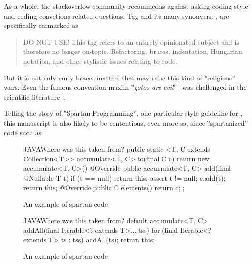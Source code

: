 As a whole, the stackoverlow community
recommedns against asking coding style and coding convetions related questions.
Tag  and its many synonyms: ,
 are specifically
earmarked as
\begin{quote}
DO NOT USE! This tag refers to an entirely opinionated subject and is therefore
no longer on-topic. Refactoring, braces, indentation, Hungarian notation, and
other stylistic issues relating to code.
\end{quote}
But it is not only curly braces matters that may raise
this kind of ‟religious” wars. Even the famous convention maxim ‟\emph{gotos
are evil}”~\cite{Dijksta:must be in bib} was challenged in the scientific
literature~\cite{Knuth: and there are several others}.

Telling the story of ‟Spartan Programming”, one particular style guideline for
\Java, this manuscript is also likely to be contentious, even more so, since
‟spartanized” code such as

\begin{figure}[h]
  \begin{Code}{JAVA}{Where was this taken from?}
public static <T, C extends Collection<T>>
                              accumulate<T, C> to(final C c) {
  return new accumulate<T, C>() {
    @Override public accumulate<T, C> add(final @Nullable T t) {
      if (t == null)
        return this;
      assert t != null;
      c.add(t);
      return this;
    }
    @Override public C elements() {
      return c;
    }
  };
}
\end{Code}
\label{figure:shock}
\caption{An example of spartan code}
\end{figure}

\begin{figure}[h]
\begin{Code}{JAVA}{Where was this taken from?}
default accumulate<T, C> addAll(final Iterable<? extends T>... tss) {
  for (final Iterable<? extends T> ts : tss)
    addAll(ts);
  return this;
}
\end{Code}
\label{figure:shock-2}
\caption{An example of spartan code}
\end{figure}

